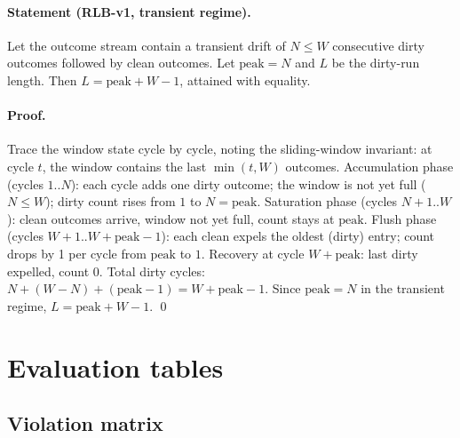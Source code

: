 \documentclass[11pt,a4paper]{article}
\begin{document}
\paragraph{Statement (RLB-v1, transient regime).}
Let the outcome stream contain a transient drift of $N \le W$
consecutive dirty outcomes followed by clean outcomes. Let
$\mathrm{peak} = N$ and $L$ be the dirty-run length. Then
$L = \mathrm{peak} + W - 1$, attained with equality.

\paragraph{Proof.}
Trace the window state cycle by cycle, noting the sliding-window
invariant: at cycle $t$, the window contains the last
$\min(t, W)$ outcomes. Accumulation phase (cycles $1..N$): each
cycle adds one dirty outcome; the window is not yet full
($N \le W$); dirty count rises from $1$ to $N = \mathrm{peak}$.
Saturation phase (cycles $N+1..W$): clean outcomes arrive,
window not yet full, count stays at $\mathrm{peak}$. Flush phase
(cycles $W+1..W+\mathrm{peak}-1$): each clean expels the oldest
(dirty) entry; count drops by 1 per cycle from $\mathrm{peak}$ to
$1$. Recovery at cycle $W+\mathrm{peak}$: last dirty expelled,
count $0$. Total dirty cycles: $N + (W - N) + (\mathrm{peak} - 1)
= W + \mathrm{peak} - 1$. Since $\mathrm{peak} = N$ in the
transient regime, $L = \mathrm{peak} + W - 1$. \qed

\section{Evaluation tables}
\label{app:eval}

\subsection{Violation matrix}
\end{document}
